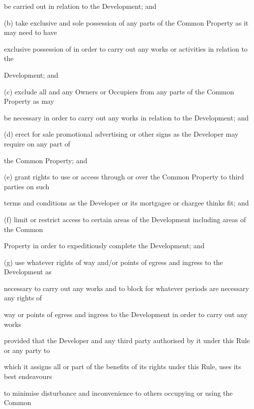 \documentclass{article}
\begin{document}
{\fontsize{10.02}{1}be carried out in relation to the Development; and }

{\fontsize{9.962}{1}(b) take exclusive and sole possession of any parts of the Common Property as it may need to have }

{\fontsize{10.02}{1}exclusive possession of in order to carry out any works or activities in relation to the }

\newpage

{\fontsize{10.02}{1}Development; and }

{\fontsize{9.962}{1}(c) exclude all and any Owners or Occupiers from any parts of the Common Property as may }

{\fontsize{10.02}{1}be necessary in order to carry out any works in relation to the Development; and }

{\fontsize{9.962}{1}(d) erect for sale promotional advertising or other signs as the Developer may require on any part of }

{\fontsize{10.02}{1}the Common Property; and }

{\fontsize{9.962}{1}(e) grant rights to use or access through or over the Common Property to third parties on such }

{\fontsize{10.02}{1}terms and conditions as the Developer or its mortgagee or chargee thinks fit; and }

{\fontsize{9.962}{1}(f) limit or restrict access to certain areas of the Development including areas of the Common }

{\fontsize{10.02}{1}Property in order to expeditiously complete the Development; and }

{\fontsize{9.962}{1}(g) use whatever rights of way and/or points of egress and ingress to the Development as }

{\fontsize{10.02}{1}necessary to carry out any works and to block for whatever periods are necessary any rights of }

{\fontsize{10.02}{1}way or points of egress and ingress to the Development in order to carry out any works }

{\fontsize{10.02}{1}provided that the Developer and any third party authorised by it under this Rule or any party to }

{\fontsize{10.02}{1}which it assigns all or part of the benefits of its rights under this Rule, uses its best endeavours }

{\fontsize{10.02}{1}to minimise disturbance and inconvenience to others occupying or using the Common }
\end{document}
